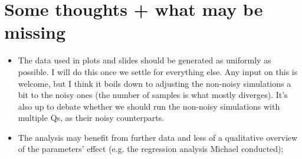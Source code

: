 \documentclass[a4paper]{article}
\begin{document}



\newpage

\section{Some thoughts + what may be missing}
\begin{itemize}
  \item The data used in plots and slides should be generated as uniformly as possible. I will do this once we settle for everything else. Any input on this is welcome, but I think it boils down to adjusting the non-noisy simulations a bit to the noisy ones (the number of samples is what mostly diverges). It's also up to debate whether we should run the non-noisy simulations with multiple Qs, as their noisy counterparts. 
  \item The analysis may benefit from further data and less of a qualitative overview of the parameters' effect (e.g. the regression analysis Michael conducted);
\end{itemize}
\end{document}
